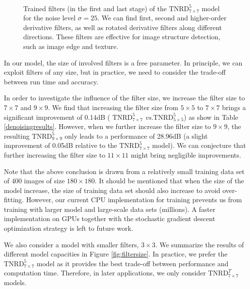 \documentclass[10pt,journal,compsoc]{IEEEtran}
\newcommand{\vs}{\emph{vs.}}
\begin{document}
\begin{figure}[t!]
\centering
{}\\
\vspace*{-0.25cm}
\vspace*{-0.25cm}
\caption{Trained filters (in the first and last stage) of the $\text{TNRD}^5_{7\times 7}$ model for the noise level $\sigma = 25$. 
We can find first, second and higher-order derivative filters, as well as rotated derivative filters along different directions. These filters 
are effective for image structure detection, such as image edge and texture.}\label{fig:filters}
\vspace*{-0.25cm}
\end{figure}
In our model, the size of involved filters is a free parameter. 
In principle, we can exploit filters of any size, but in practice, we 
need to consider the trade-off between run time and accuracy. 

In order to investigate the influence of the filter size, we increase the filter size to $7 \times 7$ and $9 \times 9$. We find 
that increasing the filter size from $5 \times 5$ to $7 \times 7$ brings a significant improvement of 0.14dB (
$\text{TNRD}^5_{7\times 7}$ \vs $\text{TNRD}^5_{5\times 5}$) as show in Table \ref{denoisingresults}. 
However, when we further increase the filter size to $9 \times 9$, the resulting $\text{TNRD}^5_{9\times 9}$ only leads to a 
performance of 28.96dB (a slight improvement of 0.05dB relative to the $\text{TNRD}^5_{7\times 7}$ model). 
We can conjecture that further increasing the filter size to $11 \times 11$ 
might bring negligible improvements. 

{Note that the above conclusion is drawn from a relatively small training 
data set of 400 images of size $180 \times 180$. It should be 
mentioned that when the size of the model increase, the size of training data set 
should also increase to avoid over-fitting. 
However, our current CPU implementation for training 
prevents us from training with larger model and large-scale data sets (millions). 
A faster implementation on GPUs together with the stochastic gradient descent 
optimization strategy is left to future work.}

We also consider a model with 
smaller filters, $3 \times 3$. We summarize the results of different model capacities in Figure \ref{fig:filtersize}. 
In practice, we prefer the $\text{TNRD}^5_{7\times 7}$ 
model as it provides the best trade-off between performance and computation time. 
Therefore, in later applications, we only consider $\text{TNRD}^T_{7\times 7}$ models. 
\end{document}
